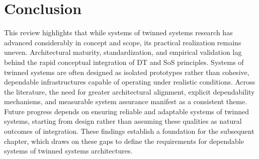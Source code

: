 \section{Conclusion}\label{sec:literature-review-conclusion}
This review highlights that while systems of twinned systems research has advanced considerably in concept and scope, its practical realization remains uneven.
Architectural maturity, standardization, and empirical validation lag behind the rapid conceptual integration of DT and SoS principles. Systems of twinned systems are often designed as isolated prototypes rather than cohesive, dependable infrastructures capable of operating under realistic conditions. Across the literature, the need for greater architectural alignment, explicit dependability mechanisms, and measurable system assurance manifest as a consistent theme. Future progress depends on ensuring reliable and adaptable systems of twinned systems, starting from design rather than assuming these qualities as natural outcomes of integration. These findings establish a foundation for the subsequent chapter, which draws on these gaps to define the requirements for dependable systems of twinned systems architectures. 